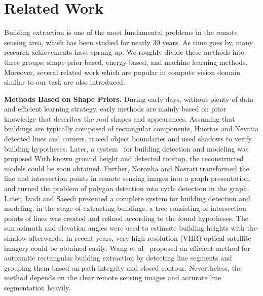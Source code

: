 \section{Related Work}
\label{Sec:RelatedWork}


Building extraction is one of the most fundamental problems in the remote sensing area, which has been studied for nearly 30 years.
As time goes by, many research achievements have sprung up.
We roughly divide these methods into three groups: shape-prior-based, energy-based, and machine learning methods.
Moreover, several related work which are popular in compute vision domain similar to our task are also introduced.


\noindent\textbf{Methods Based on Shape Priors.}
During early days, without plenty of data and efficient learning strategy, early methods are mainly based on prior knowledge that describes the roof shapes and appearances.
%
Assuming that buildings are typically composed of rectangular components,
Huertas and Nevatia \cite{IEEEexample:huertas1988detecting} detected lines and corners, traced object boundaries and used shadows to verify building hypotheses.
%
Later, a system~\cite{IEEEexample:noronha2001detection} for building detection and modeling was proposed 
With known ground height and detected rooftop, the reconstructed models could be soon obtained.
Further, Noronha and Nosrati \cite{IEEEexample:nosrati2009novel} transformed the line and intersection points in remote sensing images into a graph presentation, and turned the problem of polygon detection into cycle detection in the graph.
Later, Izadi and Saeedi\cite{IEEEexample:izadi2012three} presented a complete system for building detection and modeling.
 in the stage of extracting buildings, a tree consisting of intersection points of lines was created and refined according to the found hypotheses.
The sun azimuth and elevation angles were used to estimate building heights with the shadow afterwards.
In recent years, very high resolution (VHR) optical satellite imagery could be obtained easily.
Wang et al~\cite{IEEEexample:wang2015efficient} proposed an efficient method for automatic rectangular building extraction by detecting line segments and grouping them based on path integrity and closed contour. Nevertheless, the method depends on the clear remote sensing images and accurate line segmentation heavily.


